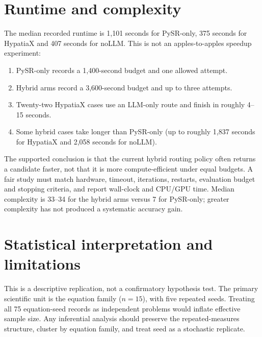 \documentclass[11pt,a4paper]{article}
\begin{document}
\section{Runtime and complexity}
The median recorded runtime is 1,101 seconds for PySR-only, 375 seconds for HypatiaX and 407 seconds for noLLM. This is not an apples-to-apples speedup experiment:
\begin{enumerate}
\item PySR-only records a 1,400-second budget and one allowed attempt.
\item Hybrid arms record a 3,600-second budget and up to three attempts.
\item Twenty-two HypatiaX cases use an LLM-only route and finish in roughly 4--15 seconds.
\item Some hybrid cases take longer than PySR-only (up to roughly 1,837 seconds for HypatiaX and 2,058 seconds for noLLM).
\end{enumerate}
The supported conclusion is that the current hybrid routing policy often returns a candidate faster, not that it is more compute-efficient under equal budgets. A fair study must match hardware, timeout, iterations, restarts, evaluation budget and stopping criteria, and report wall-clock and CPU/GPU time. Median complexity is 33--34 for the hybrid arms versus 7 for PySR-only; greater complexity has not produced a systematic accuracy gain.

\section{Statistical interpretation and limitations}
This is a descriptive replication, not a confirmatory hypothesis test. The primary scientific unit is the equation family ($n=15$), with five repeated seeds. Treating all 75 equation-seed records as independent problems would inflate effective sample size. Any inferential analysis should preserve the repeated-measures structure, cluster by equation family, and treat seed as a stochastic replicate.
\end{document}
